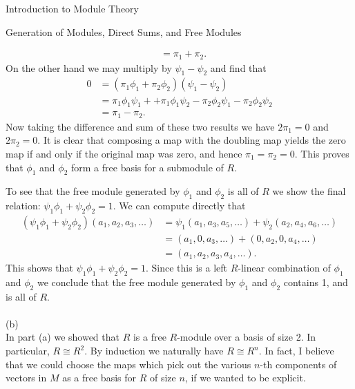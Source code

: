 \begin{chapter}{Introduction to Module Theory}
\begin{section}{Generation of Modules, Direct Sums, and Free Modules}
\begin{solution}
\begin{align*}
& = \pi_1 + \pi_2.
\end{align*}
On the other hand we may multiply by $\psi_1-\psi_2$ and find that \begin{align*}
0 &= (\pi_1\phi_1 + \pi_2\phi_2)(\psi_1-\psi_2)\\
&= \pi_1\phi_1\psi_1 + +\pi_1\phi_1\psi_2 - \pi_2\phi_2\psi_1 - \pi_2\phi_2\psi_2\\
& = \pi_1 - \pi_2.
\end{align*}
Now taking the difference and sum of these two results we have $2\pi_1 = 0$ and $2\pi_2 = 0$. It is clear that composing a map with the doubling map yields the zero map if and only if the original map was zero, and hence $\pi_1 = \pi_2 = 0$. This proves that $\phi_1$ and $\phi_2$ form a free basis for a submodule of $R$. 

To see that the free module generated by $\phi_1$ and $\phi_2$ is all of $R$ we show the final relation: $\psi_1\phi_1+\psi_2\phi_2 = 1$. We can compute directly that \begin{align*}
(\psi_1\phi_1+\psi_2\phi_2)(a_1,a_2,a_3,\ldots) &= \psi_1(a_1,a_3,a_5,\ldots) + \psi_2(a_2,a_4,a_6,\ldots)\\
& = (a_1,0,a_3,\ldots) + (0,a_2,0,a_4,\ldots)\\
& = (a_1,a_2,a_3,a_4,\ldots).
\end{align*}
This shows that $\psi_1\phi_1+\psi_2\phi_2 = 1$. Since this is a left $R$-linear combination of $\phi_1$ and $\phi_2$ we conclude that the free module generated by $\phi_1$ and $\phi_2$ contains 1, and is all of $R$.\\\\
\noindent (b)\\
In part (a) we showed that $R$ is a free $R$-module over a basis of size 2. In particular, $R\cong R^2$. By induction we naturally have $R\cong R^n$. In fact, I believe that we could choose the maps which pick out the various $n$-th components of vectors in $M$ as a free basis for $R$ of size $n$, if we wanted to be explicit. 
\end{solution}\oneperpage



\end{section}










\end{chapter}
